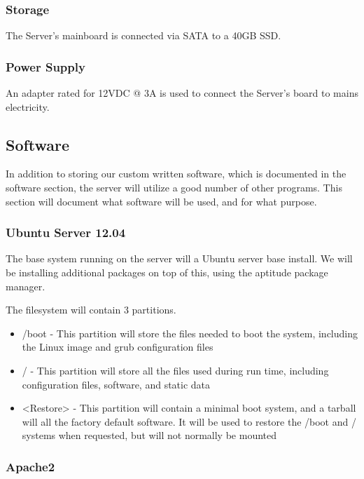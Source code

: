 \subsubsection{Storage}
The Server's mainboard is connected via \ac{SATA} to a 40GB \ac{SSD}.

\subsubsection{Power Supply}
An adapter rated for 12\ac{VDC} @ 3\ac{A} is used to connect the Server's board to mains electricity.

\subsection{Software}

In addition to storing our custom written software, which is documented in the software section, the server will utilize a good number of other programs. 
This section will document what software will be used, and for what purpose.

\subsubsection{Ubuntu Server 12.04}

The base system running on the server will a Ubuntu server base install. 
We will be installing additional packages on top of this, using the aptitude package manager.

The filesystem will contain 3 partitions.

\begin{itemize}
 \item /boot - This partition will store the files needed to boot the system, including the Linux image and grub configuration files
 \item / - This partition will store all the files used during run time, including configuration files, software, and static data
 \item <Restore> - This partition will contain a minimal boot system, and a tarball will all the factory default software. It will be used to restore the /boot and / systems when requested, but will not normally be mounted
\end{itemize}

\subsubsection{Apache2}

